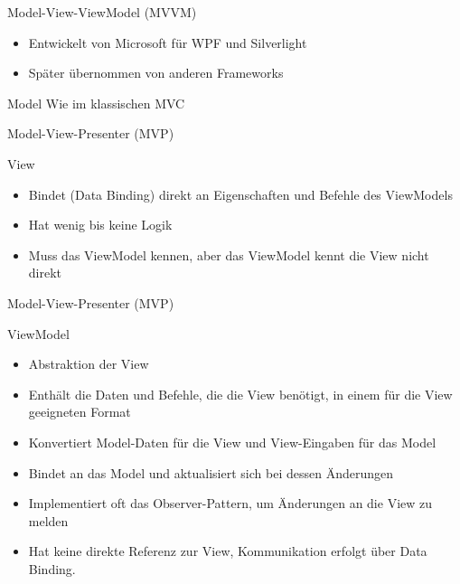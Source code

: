 \begin{frame}{Model-View-ViewModel (MVVM)}
	\begin{itemize}
	  \item Entwickelt von Microsoft für WPF und Silverlight 
	  \item Später übernommen von anderen Frameworks
	\end{itemize}
	\pause
	\begin{block}{Model}
		Wie im klassischen MVC
	\end{block}
\end{frame}

\begin{frame}{Model-View-Presenter (MVP)}
	\begin{block}{View}
		\begin{itemize}
		  \item Bindet (Data Binding) direkt an Eigenschaften und Befehle des ViewModels
		  \item Hat wenig bis keine Logik
		  \item Muss das ViewModel kennen, aber das ViewModel kennt die View nicht direkt 
		\end{itemize}
	\end{block}
\end{frame}

\begin{frame}{Model-View-Presenter (MVP)}
	\begin{block}{ViewModel}
		\begin{itemize}
		  \item Abstraktion der View
		  \item Enthält die Daten und Befehle, die die View benötigt, in einem für die View geeigneten Format
		  \item Konvertiert Model-Daten für die View und View-Eingaben für das Model
		  \item Bindet an das Model und aktualisiert sich bei dessen Änderungen
		  \item Implementiert oft das Observer-Pattern, um Änderungen an die View zu melden
		  \item Hat keine direkte Referenz zur View, Kommunikation erfolgt über Data Binding. 
		\end{itemize}
	\end{block}
\end{frame}

